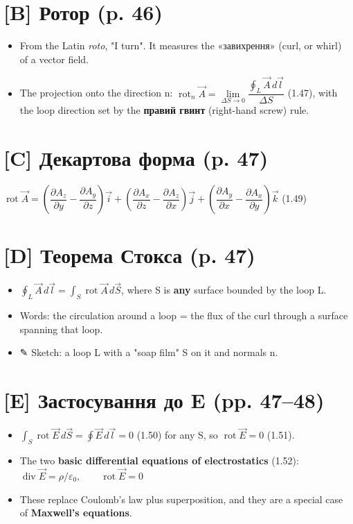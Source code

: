 \documentclass[11pt,a4paper,oneside]{book}
\newcommand{\pen}{{\sffamily\color{accent}✎}}
\begin{document}
\section*{[B] Ротор (p. 46)}
\begin{itemize}
\item From the Latin \textit{roto}, "I turn". It measures the «завихрення» (curl, or whirl) of a vector field.
\item The projection onto the direction n: $\operatorname{rot}_n\vec A = \lim\limits_{\Delta S\to0}\dfrac{\oint_L \vec A\,d\vec l}{\Delta S}$ (1.47), with the loop direction set by the \textbf{правий гвинт} (right-hand screw) rule.
\end{itemize}

\section*{[C] Декартова форма (p. 47)}
$\operatorname{rot}\vec A = \left(\dfrac{\partial A_z}{\partial y}-\dfrac{\partial A_y}{\partial z}\right)\vec i + \left(\dfrac{\partial A_x}{\partial z}-\dfrac{\partial A_z}{\partial x}\right)\vec j + \left(\dfrac{\partial A_y}{\partial x}-\dfrac{\partial A_x}{\partial y}\right)\vec k$ (1.49)

\section*{[D] Теорема Стокса (p. 47)}
\begin{itemize}
\item $\oint_L \vec A\,d\vec l = \int_S \operatorname{rot}\vec A\,d\vec S$, where S is \textbf{any} surface bounded by the loop L.
\item Words: the circulation around a loop = the flux of the curl through a surface spanning that loop.
\item \pen{} Sketch: a loop L with a "soap film" S on it and normals n.
\end{itemize}

\section*{[E] Застосування до E (pp. 47–48)}
\begin{itemize}
\item $\int_S \operatorname{rot}\vec E\,d\vec S = \oint \vec E\,d\vec l = 0$ (1.50) for any S, so $\operatorname{rot}\vec E = 0$ (1.51).
\item The two \textbf{basic differential equations of electrostatics} (1.52):
$\operatorname{div}\vec E = \rho/\varepsilon_0,\qquad \operatorname{rot}\vec E = 0$
\item These replace Coulomb's law plus superposition, and they are a special case of \textbf{Maxwell's equations}.
\end{itemize}
\end{document}
